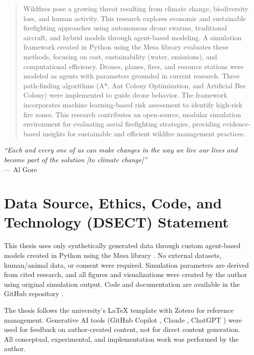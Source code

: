 \documentclass[11pt, a4paper]{article}
\begin{document}



\setcounter{page}{1}

\begin{abstract}
Wildfires pose a growing threat resulting from climate change, biodiversity loss, and human activity. This research explores economic and sustainable firefighting approaches using autonomous drone swarms, traditional aircraft, and hybrid models through agent-based modeling. A simulation framework created in Python using the Mesa library evaluates these methods, focusing on cost, sustainability (water, emissions), and computational efficiency. Drones, planes, fires, and resource stations were modeled as agents with parameters grounded in current research. Three path-finding algorithms (A*, Ant Colony Optimization, and Artificial Bee Colony) were implemented to guide drone behavior. The framework incorporates machine learning-based risk assessment to identify high-risk fire zones. This research contributes an open-source, modular simulation environment for evaluating aerial firefighting strategies, providing evidence-based insights for sustainable and efficient wildfire management practices.


\end{abstract}

\emph{``Each and every one of us can make changes in the way we live our lives and become part of the solution [to climate change]''} \\
--- Al Gore

\section{Data Source, Ethics, Code, and Technology (DSECT) Statement}
\label{sec:CodeOfCondunt}

This thesis uses only synthetically generated data through custom agent-based models created in Python using the Mesa library \citep{terMesa}. No external datasets, human/animal data, or consent were required. Simulation parameters are derived from cited research, and all figures and visualizations were created by the author using original simulation output. Code and documentation are available in the GitHub repository \citep{AgentBasedFirefightingModel_repository}.

The thesis follows the university's LaTeX template with Zotero \citep{zotero} for reference management. Generative AI tools (GitHub Copilot \citep{github_copilot}, Claude \citep{claudeai}, ChatGPT \citep{openai_chatgpt}) were used for feedback on author-created content, not for direct content generation. All conceptual, experimental, and implementation work was performed by the author.
\end{document}
